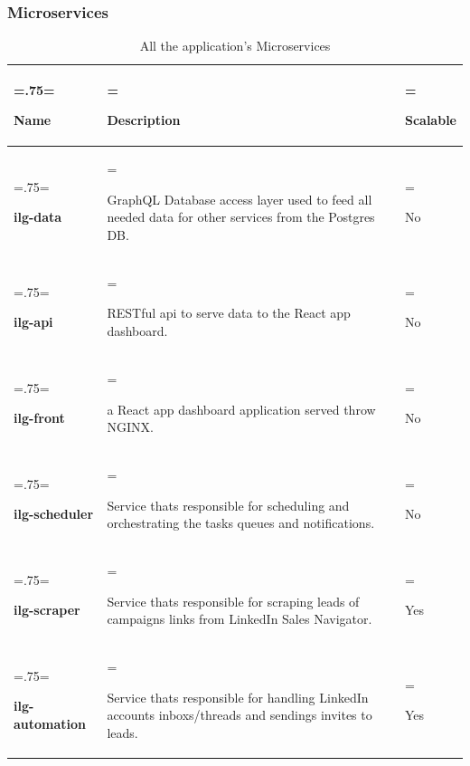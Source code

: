 \subsubsection{Microservices}
\begin{table}[H]
	\renewcommand{\arraystretch}{1.5}%
	\caption{All the application's Microservices}
	\centering
	\medskip
	\begin{tabularx}{1\textwidth} {
			| >{\hsize=.75\hsize\linewidth=\hsize\raggedright\arraybackslash}X
			| >{\hsize=1.8\hsize\linewidth=\hsize\raggedright\arraybackslash}X
			| >{\hsize=0.45\hsize\linewidth=\hsize\raggedright\arraybackslash}X |}
		\hline
		\rowcolor{primary} \textbf {Name} & \textbf {Description}                                                                                  & \textbf {Scalable} \\
		\hline
		\textbf {ilg-data}                & GraphQL Database access layer used to feed all needed data for other services from the Postgres DB.    & No                 \\
		\hline
		\textbf {ilg-api}                 & RESTful api to serve data to the React app dashboard.                                                  & No                 \\
		\hline
		\textbf {ilg-front}               & a React app dashboard application served throw NGINX.                                                  & No                 \\
		\hline
		\textbf {ilg-scheduler}           & Service thats responsible for scheduling and orchestrating the tasks queues and notifications.         & No                 \\
		\hline
		\textbf {ilg-scraper}             & Service thats responsible for scraping leads of campaigns links from LinkedIn Sales Navigator.         & Yes                \\
		\hline
		\textbf {ilg-automation}          & Service thats responsible for handling LinkedIn accounts inboxs/threads and sendings invites to leads. & Yes                \\
		\hline
	\end{tabularx}
\end{table}
\newpage
